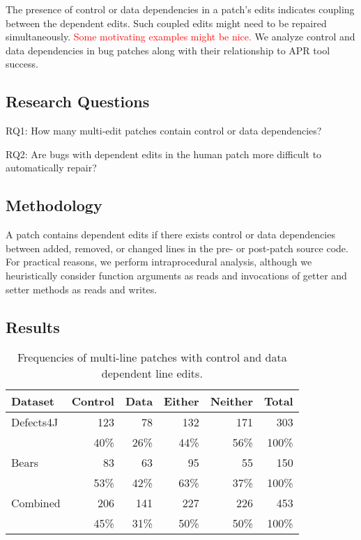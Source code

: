 \documentclass[sigconf, timestamp-false, anonymous=true]{acmart}
\newcommand\todo[1]{\textcolor{red}{#1}}
\begin{document}
The presence of control or data dependencies in a patch's edits 
indicates coupling between the dependent edits.
Such coupled edits might need to be repaired simultaneously.
\todo{Some motivating examples might be nice.}
We analyze control and data dependencies in bug patches along 
with their relationship to APR tool success.

\subsection{Research Questions}

RQ1: How many multi-edit patches contain control or data dependencies?

RQ2: Are bugs with dependent edits in the human patch more difficult to automatically repair?

\subsection{Methodology}

A patch contains dependent edits if there exists control or data dependencies 
between added, removed, or changed lines in the pre- or post-patch
source code. For practical reasons, we perform intraprocedural analysis, 
although we heuristically consider function arguments as reads 
and invocations of getter and setter methods as reads and writes.

\subsection{Results}

\begin{table}
{\begin{center}
	\begin{tabular}{l | rrrr | r}
		\toprule
		Dataset & Control & Data & Either & Neither & Total \\
		\midrule
		Defects4J & 123 & 78 & 132 & 171 & 303 \\
		& 40\% & 26\% & 44\% & 56\% & 100\% \\
		Bears & 83 & 63 & 95 & 55 & 150 \\
		& 53\% & 42\% & 63\% & 37\% & 100\% \\
		\midrule
		Combined & 206 & 141 & 227 & 226 & 453 \\
		& 45\% & 31\% & 50\% & 50\% & 100\% \\
		\bottomrule
	\end{tabular}
 \end{center}
}
	\caption{Frequencies of multi-line patches with control and data dependent line edits.}
	\label{tab:dependency}
\end{table}
\end{document}
